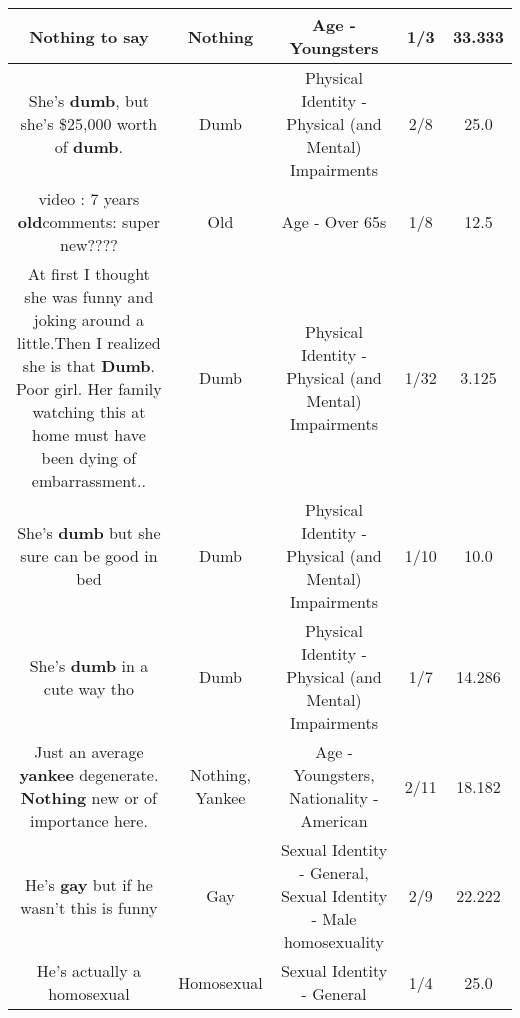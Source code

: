\documentclass[11pt]{article}
\newlength\mylength
\begin{document}
\begin{center}
\begin{longtable}{|C{.65\mylength}|C{.30\mylength}|C{.12\mylength}|C{.12\mylength}|C{.12\mylength}|}
  \small Nothing to say\normalsize   & Nothing & Age - Youngsters & 1/3 & 33.333 \\  \hline
  \small She's \textbf{dumb}, but she's \$25,000 worth of \textbf{dumb}.\normalsize   & Dumb & Physical Identity - Physical (and Mental) Impairments & 2/8 & 25.0 \\  \hline
  \small video : 7 years \textbf{old}comments: super new????\normalsize   & Old & Age - Over 65s & 1/8 & 12.5 \\  \hline
  \small At first I thought she was funny and joking around a little.Then I realized she is that \textbf{Dumb}. Poor girl. Her family watching this at home must have been dying of embarrassment..\normalsize   & Dumb & Physical Identity - Physical (and Mental) Impairments & 1/32 & 3.125 \\  \hline
  \small She's \textbf{dumb} but she sure can be good in bed\normalsize   & Dumb & Physical Identity - Physical (and Mental) Impairments & 1/10 & 10.0 \\  \hline
  \small She's \textbf{dumb} in a cute way tho\normalsize   & Dumb & Physical Identity - Physical (and Mental) Impairments & 1/7 & 14.286 \\  \hline
  \small Just an average \textbf{yankee} degenerate. \textbf{Nothing} new or of importance here.\normalsize   & Nothing, Yankee & Age - Youngsters, Nationality - American & 2/11 & 18.182 \\  \hline
  \small He's \textbf{g\textbf{ay}} but if he wasn't this is funny\normalsize   & Gay & Sexual Identity - General, Sexual Identity - Male homosexuality & 2/9 & 22.222 \\  \hline
  \small He's actually a homosexual\normalsize   & Homosexual & Sexual Identity - General & 1/4 & 25.0 \\  \hline

\end{longtable}
\end{center}
\end{document}
